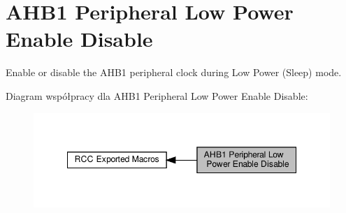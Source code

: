 \hypertarget{group___r_c_c___a_h_b1___low_power___enable___disable}{}\section{A\+H\+B1 Peripheral Low Power Enable Disable}
\label{group___r_c_c___a_h_b1___low_power___enable___disable}


Enable or disable the A\+H\+B1 peripheral clock during Low Power (Sleep) mode.  


Diagram współpracy dla A\+H\+B1 Peripheral Low Power Enable Disable\+:\nopagebreak
\begin{figure}[H]
\begin{center}
\leavevmode
\includegraphics[width=348pt]{group___r_c_c___a_h_b1___low_power___enable___disable}
\end{center}
\end{figure}
